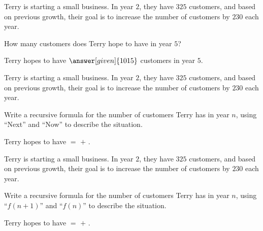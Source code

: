 \documentclass[nooutcomes]{ximera}
\begin{document}
\begin{problem}
Terry is starting a small business.  In year $2$, they have $325$ customers, and based on previous growth, their goal is to increase the number of customers by $230$ each year.


How many customers does Terry hope to have in year $5$?

\begin{prompt}
Terry hopes to have $\answer[given]{1015}$ customers in year $5$.
\end{prompt}
\end{problem}




\begin{problem}
Terry is starting a small business.  In year $2$, they have $325$ customers, and based on previous growth, their goal is to increase the number of customers by $230$ each year.


Write a recursive formula for the number of customers Terry has in year $n$, using ``Next'' and ``Now'' to describe the situation.

\begin{prompt}
Terry hopes to have  $=$  $+$ .
\end{prompt}
\end{problem}



\begin{problem}
Terry is starting a small business.  In year $2$, they have $325$ customers, and based on previous growth, their goal is to increase the number of customers by $230$ each year.


Write a recursive formula for the number of customers Terry has in year $n$, using ``$f(n+1)$'' and ``$f(n)$'' to describe the situation.

\begin{prompt}
Terry hopes to have  $=$  $+$ .
\end{prompt}
\end{problem}
\end{document}
